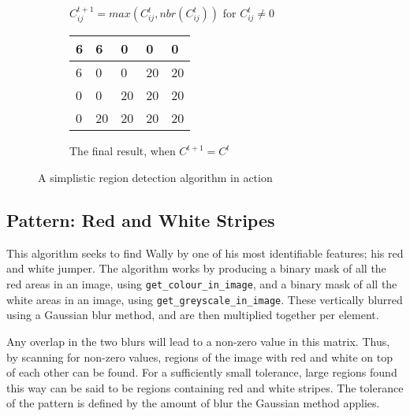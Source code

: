 \documentclass[../main.tex]{subfiles}
\begin{document}
\begin{figure}[h]
\begin{subfigure}[b]{0.45\textwidth}
\begin{tabular}{|p{1em}|p{1em}|p{1em}|p{1em}|p{1em}|}
        \end{tabular}
        \caption{$C^{t+1}_{ij}=max\left(C^t_{ij},nbr(C^t_{ij})\right)$ for $C^t_{ij} \neq 0$}
      \end{subfigure}
      \begin{subfigure}[b]{0.45\textwidth}
        \centering
        \begin{tabular}{|p{1em}|p{1em}|p{1em}|p{1em}|p{1em}|}
          \hline
          6&6&0&0&0\\ \hline
          6&0&0&20&20\\ \hline
          0&0&20&20&20\\ \hline
          0&20&20&20&20\\  \hline
        \end{tabular}
        \caption{The final result, when $C^{t+1} = C^t$}
      \end{subfigure}
      \caption{A simplistic region detection algorithm in action}
      \label{simpleregion}
    \end{figure}
  \subsection{Pattern: Red and White Stripes}
    This algorithm seeks to find Wally by one of his most identifiable features; his red and white jumper.
    The algorithm works by producing a binary mask of all the red areas in an image, using \texttt{get\_colour\_in\_image}, and a binary mask of all the white areas in an image, using \texttt{get\_greyscale\_in\_image}.
    These vertically blurred using a Gaussian blur method, and are then multiplied together per element.
    
    Any overlap in the two blurs will lead to a non-zero value in this matrix.
    Thus, by scanning for non-zero values, regions of the image with red and white on top of each other can be found.
    For a sufficiently small tolerance, large regions found this way can be said to be regions containing red and white stripes.
    The tolerance of the pattern is defined by the amount of blur the Gaussian method applies.
    
\end{document}
